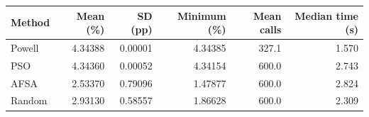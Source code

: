 \begin{tabular}{lrrrrr}
\toprule
Method & Mean (\%) & SD (pp) & Minimum (\%) & Mean calls & Median time (s) \\
\midrule
Powell & 4.34388 & 0.00001 & 4.34385 & 327.1 & 1.570 \\
PSO & 4.34360 & 0.00052 & 4.34154 & 600.0 & 2.743 \\
AFSA & 2.53370 & 0.79096 & 1.47877 & 600.0 & 2.824 \\
Random & 2.93130 & 0.58557 & 1.86628 & 600.0 & 2.309 \\
\bottomrule
\end{tabular}
